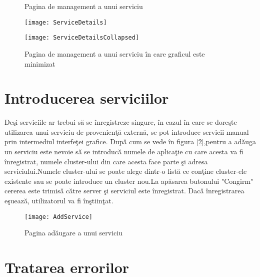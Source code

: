 \documentclass[a4paper,12pt]{report}
\let\oldref\ref
\renewcommand{\ref}[1]{[\oldref{#1}]}
\begin{document}
\begin{figure}[!htb]
	\caption{Pagina de management a unui serviciu}
	\texttt{[image: ServiceDetails]}
	\label{fig:ServiceDetails}
	\caption{Pagina de management a unui serviciu \^ in care graficul este minimizat}
	\texttt{[image: ServiceDetailsCollapsed]}
	
\end{figure}


\section{Introducerea serviciilor}

De\c si serviciile ar trebui s\u a se \^inregistreze singure, \^in cazul \^in care se dore\c ste utilizarea unui
serviciu de provenien\c t\u a extern\u a, se pot introduce servicii manual prin intermediul interfe\c tei grafice.
Dup\u a cum se vede \^in figura \ref{fig:AddService},pentru a ad\u auga un serviciu este nevoie s\u a se introduc\u a
numele de aplica\c tie cu care acesta va fi \^inregistrat, numele cluster-ului din care acesta face parte \c si adresa 
serviciului.Numele cluster-ului se poate alege dintr-o list\u a ce con\c tine cluster-ele existente sau se poate introduce un
cluster nou.La ap\u asarea butonului "Congirm" cererea este trimis\u a c\u atre server \c si serviciul este \^inregistrat.
Dac\u a \^inregistrarea e\c sueaz\u a, utilizatorul va fi \^in\c stiin\c tat.

\begin{figure}[!htb]
	\caption{Pagina ad\u augare a unui serviciu}
	\texttt{[image: AddService]}
	\label{fig:AddService}
\end{figure}

\section{Tratarea errorilor}
\end{document}
